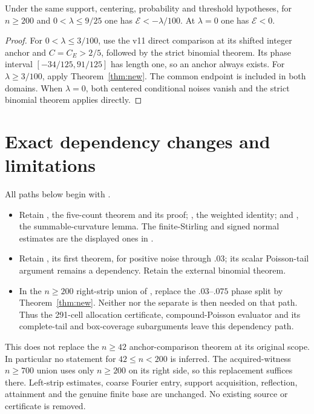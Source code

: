 \documentclass[11pt,a4paper]{article}
\begin{document}
\begin{corollary}\label{cor:union}
Under the same support, centering, probability and threshold hypotheses,
for $n\ge200$ and $0<\lambda\le9/25$ one has
$\mathcal E<-\lambda/100$. At $\lambda=0$ one has $\mathcal E<0$.
\end{corollary}
\begin{proof}
For $0<\lambda\le3/100$, use the v11 direct comparison at its shifted
integer anchor and $C=C_E>2/5$, followed by the strict binomial theorem.
Its phase interval $[-34/125,91/125]$ has length one, so an anchor always
exists. For $\lambda\ge3/100$, apply Theorem~\ref{thm:new}. The common
endpoint is included in both domains. When $\lambda=0$, both centered
conditional noises vanish and the strict binomial theorem applies directly.
\end{proof}

\section*{Exact dependency changes and limitations}
All paths below begin with .
\begin{sloppypar}
\begin{itemize}
\item Retain , the
five-count theorem and its proof; ,
the weighted identity; and ,
the summable-curvature lemma. The finite-Stirling and signed normal estimates
are the displayed ones in .
\item Retain , its first
theorem, for positive noise through $.03$; its scalar Poisson-tail argument
remains a dependency. Retain the external binomial theorem.
\item In the $n\ge200$ right-strip union of
, replace the $.03$--$.075$
phase split by Theorem~\ref{thm:new}. Neither
 nor the separate
 is then needed on that path.
Thus the 291-cell allocation certificate, compound-Poisson evaluator and
its complete-tail and box-coverage subarguments leave this dependency path.
\end{itemize}
\end{sloppypar}
This does not replace the $n\ge42$ anchor-comparison theorem at its original
scope. In particular no statement for $42\le n<200$ is inferred. The
acquired-witness $n\ge700$ union uses only $n\ge200$ on its right side, so
this replacement suffices there. Left-strip estimates, coarse Fourier entry,
support acquisition, reflection, attainment and the genuine finite base are
unchanged. No existing source or certificate is removed.
\end{document}
